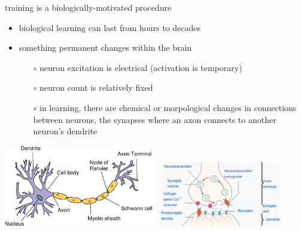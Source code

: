 \documentclass[xcolor={svgnames},
               hyperref={colorlinks,citecolor=DeepPink4,linkcolor=FireBrick,urlcolor=Maroon}]
               {beamer}
\begin{document}
\begin{frame}{training is a biologically-motivated procedure}

\begin{itemize}
\item biological learning can last from hours to decades
\item something permanent changes within the brain
    \begin{itemize}
    \item[$\circ$] neuron excitation is electrical (activation is temporary)
    \item[$\circ$] neuron count is relatively fixed
    \item[$\circ$] in learning, there are chemical or morpological changes in connections between neurons, the \alert{synapses} where an axon connects to another neuron's dendrite
    \end{itemize}
\end{itemize}

\begin{center}
\mbox{\includegraphics[width=0.5\textwidth]{figs/physicalneuron} \includegraphics[width=0.4\textwidth]{figs/synapse}}
\end{center}
\end{frame}
\end{document}
